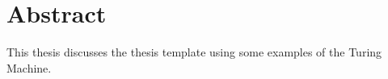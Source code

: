 
\chapter{Abstract}
This thesis discusses the thesis template using some examples of the Turing Machine.
